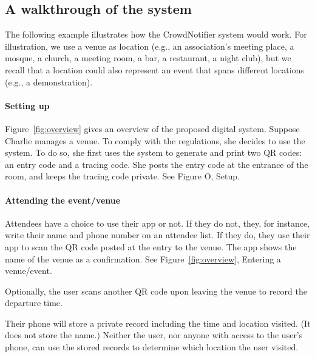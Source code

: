 \subsection{A walkthrough of the system}
The following example illustrates how the CrowdNotifier system would work. For illustration, we use a venue as location (e.g., an association’s meeting place, a mosque, a church, a meeting room, a bar, a restaurant, a night club), but we recall that a location could also represent an event that spans different locations (e.g., a demonstration). 

\paragraph{Setting up}
Figure~\ref{fig:overview} gives an overview of the proposed digital system. Suppose Charlie manages a venue. To comply with the regulations, she decides to use the system. To do so, she first uses the system to generate and print two QR codes: an entry code and a tracing code. She posts the entry code at the entrance of the room, and keeps the tracing code private. See Figure O, Setup.

\paragraph{Attending the event/venue}
Attendees have a choice to use their app or not. If they do not, they, for instance, write their name and phone number on an attendee list. If they do, they use their app to scan the QR code posted at the entry to the venue. The app shows the name of the venue as a confirmation. See Figure~\ref{fig:overview}, Entering a venue/event.

Optionally, the user scans another QR code upon leaving the venue to record the departure time.

Their phone will store a private record including the time and location visited. (It does not store the name.) Neither the user, nor anyone with access to the user’s phone, can use the stored records to determine which location the user visited.

